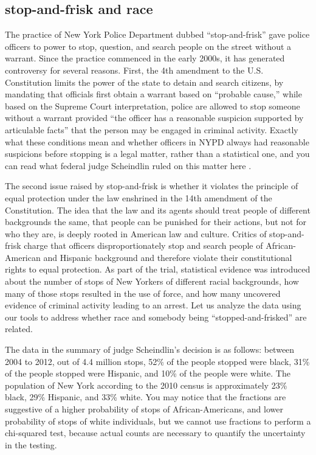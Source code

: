 \documentclass[
  letterpaper,
  DIV=11,
  numbers=noendperiod]{scrreprt}
\begin{document}
\hypertarget{stop-and-frisk-and-race}{%
\subsection{stop-and-frisk and race}\label{stop-and-frisk-and-race}}

The practice of New York Police Department dubbed ``stop-and-frisk''
gave police officers to power to stop, question, and search people on
the street without a warrant. Since the practice commenced in the early
2000s, it has generated controversy for several reasons. First, the 4th
amendment to the U.S. Constitution limits the power of the state to
detain and search citizens, by mandating that officials first obtain a
warrant based on ``probable cause,'' while based on the Supreme Court
interpretation, police are allowed to stop someone without a warrant
provided ``the officer has a reasonable suspicion supported by
articulable facts'' that the person may be engaged in criminal activity.
Exactly what these conditions mean and whether officers in NYPD always
had reasonable suspicions before stopping is a legal matter, rather than
a statistical one, and you can read what federal judge Scheindlin ruled
on this matter here \cite{_stop-and-frisk_????}.

The second issue raised by stop-and-frisk is whether it violates the
principle of equal protection under the law enshrined in the 14th
amendment of the Constitution. The idea that the law and its agents
should treat people of different backgrounds the same, that people can
be punished for their actions, but not for who they are, is deeply
rooted in American law and culture. Critics of stop-and-frisk charge
that officers disproportionately stop and search people of
African-American and Hispanic background and therefore violate their
constitutional rights to equal protection. As part of the trial,
statistical evidence was introduced about the number of stops of New
Yorkers of different racial backgrounds, how many of those stops
resulted in the use of force, and how many uncovered evidence of
criminal activity leading to an arrest. Let us analyze the data using
our tools to address whether race and somebody being
``stopped-and-frisked'' are related.

The data in the summary of judge Scheindlin's decision is as follows:
between 2004 to 2012, out of 4.4 million stops, 52\% of the people
stopped were black, 31\% of the people stopped were Hispanic, and 10\%
of the people were white. The population of New York according to the
2010 census is approximately 23\% black, 29\% Hispanic, and 33\% white.
You may notice that the fractions are suggestive of a higher probability
of stops of African-Americans, and lower probability of stops of white
individuals, but we cannot use fractions to perform a chi-squared test,
because actual counts are necessary to quantify the uncertainty in the
testing.
\end{document}
